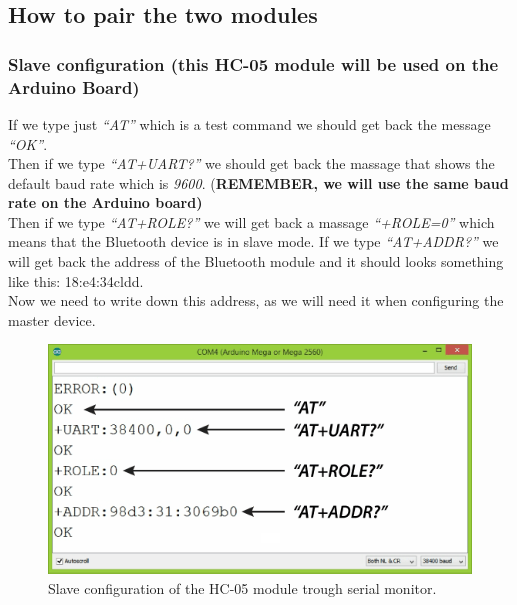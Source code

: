 \subsection{How to pair the two modules}

\subsubsection{Slave configuration (this HC-05 module will be used on the Arduino Board)}
If we type just \textit{“AT”} which is a test command we should get back the message \textit{“OK”}.\\
Then if we type \textit{“AT+UART?”} we should get back the massage that shows the default baud rate which is \textit{9600}. (\textbf{REMEMBER, we will use the same baud rate on the Arduino board)}\\
Then if we type \textit{“AT+ROLE?”} we will get back a massage \textit{“+ROLE=0”} which means that the Bluetooth device is in slave mode. If we type \textit{“AT+ADDR?”} we will get back the address of the Bluetooth module and it should looks something like this: 18:e4:34cldd. \\
Now we need to write down this address, as we will need it when configuring the master device.
\begin{figure}[H]
	\centering
	\includegraphics[width=\textwidth]
	{files/images/hc05_slave2}
	\caption{Slave configuration of the HC-05 module trough serial monitor.}
\end{figure}

